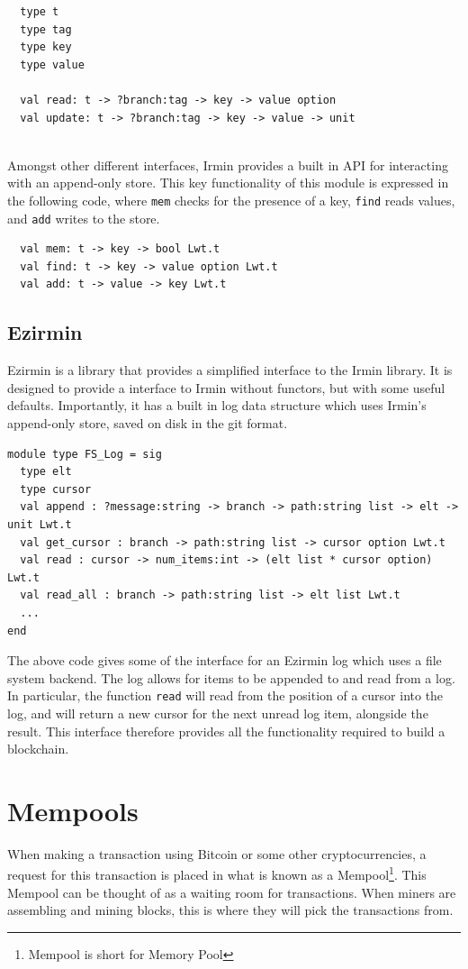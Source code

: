 \documentclass[12pt,a4paper,twoside,openright]{report}
\begin{document}
		\begin{lstlisting}
  type t
  type tag
  type key 
  type value

  val read: t -> ?branch:tag -> key -> value option
  val update: t -> ?branch:tag -> key -> value -> unit
			
		\end{lstlisting}
		Amongst other different interfaces, Irmin provides a built in API for interacting with an append-only store. This key functionality of this module is expressed in the following code, where \texttt{mem} checks for the presence of a key, \texttt{find} reads values, and \texttt{add} writes to the store.

		\begin{lstlisting}
  val mem: t -> key -> bool Lwt.t
  val find: t -> key -> value option Lwt.t
  val add: t -> value -> key Lwt.t
		\end{lstlisting}
	\subsection*{Ezirmin}
	Ezirmin is a library that provides a simplified interface to the Irmin library. It is designed to provide a interface to Irmin without functors, but with some useful defaults. Importantly, it has a built in log data structure which uses Irmin's append-only store, saved on disk in the git format.\\
	\begin{lstlisting}
module type FS_Log = sig
  type elt 
  type cursor 
  val append : ?message:string -> branch -> path:string list -> elt -> unit Lwt.t
  val get_cursor : branch -> path:string list -> cursor option Lwt.t
  val read : cursor -> num_items:int -> (elt list * cursor option) Lwt.t
  val read_all : branch -> path:string list -> elt list Lwt.t
  ...
end
	\end{lstlisting}
	The above code gives some of the interface for an Ezirmin log which uses a file system backend.
	The log allows for items to be appended to and read from a log.
	In particular, the function \texttt{read} will read from the position of a cursor into the log, and will return a new cursor for the next unread log item, alongside the result.
	This interface therefore provides all the functionality required to build a blockchain.
	\section{Mempools}
	When making a transaction using Bitcoin or some other cryptocurrencies, a request for this transaction is placed in what is known as a Mempool\footnote{Mempool is short for Memory Pool}.
	This Mempool can be thought of as a waiting room for transactions. When miners are assembling and mining blocks, this is where they will pick the transactions from.
	
\end{document}

